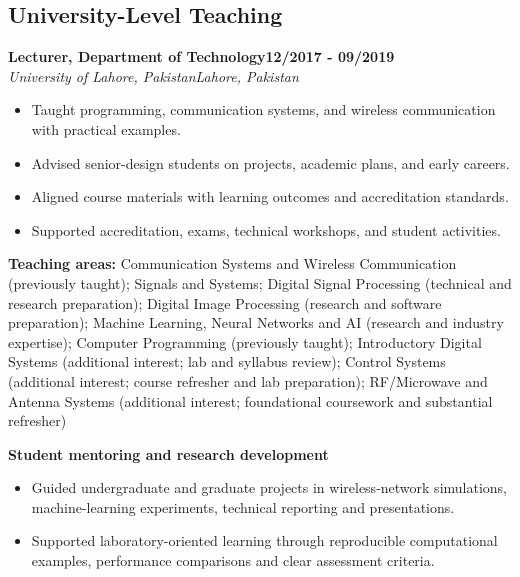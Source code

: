 \documentclass[8pt,letterpaper]{extarticle}
\newcommand{\role}[4]{%
  \Needspace{4\baselineskip}\textbf{#1}\hfill\textbf{#2}\\[-1pt]
  \textit{#3}\hfill\textit{#4}\par}
\begin{document}
\subsection{University-Level Teaching}
\role{Lecturer, Department of Technology}{12/2017 - 09/2019}{University of Lahore, Pakistan}{Lahore, Pakistan}
\begin{itemize}
\item Taught programming, communication systems, and wireless communication with practical examples.
\item Advised senior-design students on projects, academic plans, and early careers.
\item Aligned course materials with learning outcomes and accreditation standards.
\item Supported accreditation, exams, technical workshops, and student activities.
\end{itemize}
\vspace{1pt}
{\small\textbf{Teaching areas:} Communication Systems and Wireless Communication (previously taught); Signals and Systems; Digital Signal Processing (technical and research preparation); Digital Image Processing (research and software preparation); Machine Learning, Neural Networks and AI (research and industry expertise); Computer Programming (previously taught); Introductory Digital Systems (additional interest; lab and syllabus review); Control Systems (additional interest; course refresher and lab preparation); RF/Microwave and Antenna Systems (additional interest; foundational coursework and substantial refresher)}\par
{}\noindent\textbf{Student mentoring and research development}\par
\begin{itemize}
\item Guided undergraduate and graduate projects in wireless-network simulations, machine-learning experiments, technical reporting and presentations.
\item Supported laboratory-oriented learning through reproducible computational examples, performance comparisons and clear assessment criteria.
\end{itemize}
\end{document}
